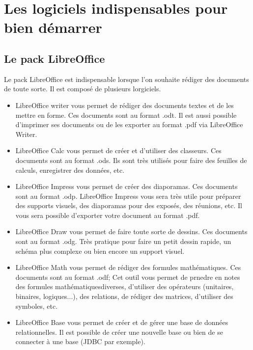 \documentclass[12pt]{book}
\begin{document}
\section{Les logiciels indispensables pour bien démarrer}
	\subsection{Le pack LibreOffice}
		Le pack LibreOffice est indispensable lorsque l'on souhaite rédiger des documents de toute sorte.\newline
		Il est composé de plusieurs lorgiciels.
		\begin{itemize}
			\item LibreOffice writer vous permet de rédiger des documents textes et de les mettre en forme.
			Ces documents sont au format .odt. 
			Il est aussi possible d'imprimer ses documents ou de les exporter au format .pdf via LibreOffice Writer.
			\item LibreOffice Calc vous permet de créer et d'utiliser des classeurs.
			Ces documents sont au format .ods. 
			Ils sont très utilisés pour faire des feuilles de calculs, enregistrer des données, etc.
			\item LibreOffice Impress vous permet de créer des diaporamas. 
			Ces documents sont au format .odp.
			LibreOffice Impress vous sera très utile pour préparer des supports visuels, des diaporamas pour des exposés, des réunions, etc.
			Il vous sera possible d'exporter votre document au format .pdf.
			\item LibreOffice Draw vous permet de faire toute sorte de dessins.
			Ces documents sont au format .odg.
			Très pratique pour faire un petit dessin rapide, un schéma plus complexe ou bien encore un support visuel.
			\item LibreOffice Math vous permet de rédiger des formules mathématiques.
			Ces documents sont au format .odf;
			Cet outil vous permet de prnedre en notes des formules mathématiquesdiverses, d'utiliser des opérateurs (unitaires, binaires, logiques...), des relations, de rédiger des matrices, d'utiliser des symboles, etc.
			\item LibreOffice Base vous permet de créer et de gérer une base de données relationnelles.
			Il est possible de créer une nouvelle base ou bien de se connecter à une base (JDBC par exemple). 
		\end{itemize}
\end{document}
